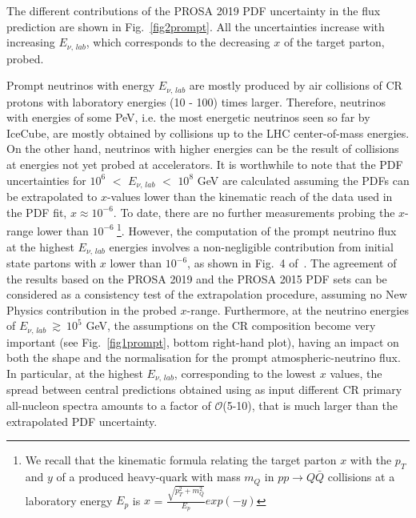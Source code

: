 \documentclass[12pt]{article}
\begin{document}
The different contributions of the PROSA 2019 PDF uncertainty in the flux prediction are shown in Fig.~\ref{fig2prompt}. All the uncertainties increase with increasing $E_{\nu,\,lab}$, which corresponds to the decreasing $x$ of the target parton, probed. 

Prompt neutrinos with energy $E_{\nu,\,lab}$ are mostly produced by air collisions of CR protons with laboratory energies (10 - 100) times larger. Therefore, neutrinos with energies of some PeV, i.e. the most energetic neutrinos seen so far by IceCube, are mostly obtained by collisions up to the LHC center-of-mass energies. On the other hand, neutrinos with higher energies can be the result of collisions at energies not yet probed at accelerators. It is worthwhile to note that the PDF uncertainties for $10^6$ $<$ $E_{\nu,\,lab}$ $<$ $10^8$ GeV are calculated assuming the PDFs can be extrapolated to $x$-values lower than the kinematic reach of the data used in the PDF fit, $x \approx 10^{-6}$. To date, there are no further measurements probing the $x$-range lower than $10^{-6\,\,}$\footnote{We recall that the kinematic formula relating the target parton $x$ with the $p_T$ and $y$ of a produced heavy-quark with mass $m_Q$ in $pp \rightarrow Q\bar{Q}$ collisions at a laboratory energy $E_p$ is $x$ = $\frac{\sqrt{p_T^2 + m_Q^2}}{E_p}exp(-y)$}. However, the computation of the prompt neutrino flux at the highest $E_{\nu,\, lab}$ energies involves a non-negligible contribution from initial state partons with $x$ lower than $10^{-6}$, as shown in Fig.~4 of~\cite{Goncalves:2017lvq}.      
The agreement of the results based on the PROSA 2019 and the PROSA 2015 PDF sets can be considered as a consistency test of the extrapolation procedure, assuming no New Physics contribution in the probed $x$-range. Furthermore, at the neutrino energies of $E_{\nu,\,lab}~\gtrsim~10^5$ GeV, the assumptions on the CR composition become very important (see Fig.~\ref{fig1prompt}, bottom right-hand plot), having an impact on both the shape and the normalisation for the prompt atmospheric-neutrino flux. In particular, at the highest $E_{\nu,\, lab}$, corresponding to the lowest $x$ values, the spread between central predictions obtained using as input different CR primary all-nucleon spectra amounts to a factor of $\mathcal{O}$(5-10), that is much larger than the extrapolated PDF uncertainty.  
\end{document}
